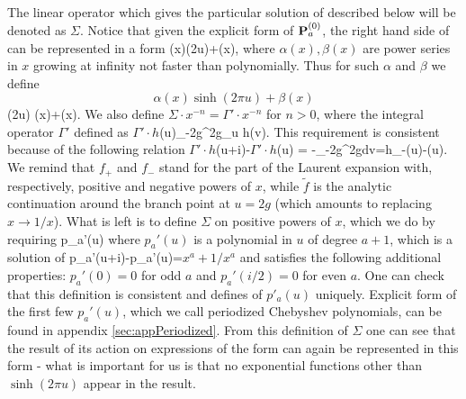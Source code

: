 The linear operator which gives the particular solution of  described below will be denoted as $\Sigma$.
Notice that given the explicit form  of ${\bf P}^{(0)}_a$, the right hand side of  can be represented in a form
\beq
\alpha(x)\sinh(2\pi u)+\beta(x),
\label{alphabetasinh}
\eeq
where $\alpha(x),\beta(x)$ are power series in $x$ growing at infinity not faster than polynomially. 
Thus for such $\alpha$ and $\beta$ we define
\beq
\Sigma\cdot\[\alpha(x)\sinh(2\pi u)+\beta(x)\]\equiv \sinh(2\pi u) \Sigma\cdot \alpha(x)+\Sigma\cdot \beta(x).
\eeq
We also define $\Sigma\cdot x^{-n}=\Gamma'\cdot x^{-n}$ for $n>0$, where the integral operator $\Gamma'$ defined as
\beq
\(\Gamma'\cdot h\)(u)\equiv \oint_{-2g}^{2g}\partial_u \log \frac{\Gamma[i (u-v)+1]}{\Gamma[-i (u-v)]}h(v).
\label{Gammaprime}
\eeq
This requirement is consistent because of the following relation
\beq
\(\Gamma'\cdot h\)(u+i)-\(\Gamma'\cdot h\)(u)
=
-\oint_{-2g}^{2g}dv=h_-(u)-(u).
\label{eq:Gammaproperty}
\eeq
We remind that $f_+$ and $f_-$ stand for the part of the Laurent expansion with, respectively, positive and negative powers of $x$, while $\tilde f$ is the analytic continuation around the branch point at $u=2g$ (which amounts to replacing $x\to 1/x$).
What is left is to define $\Sigma$ on positive powers of $x$, which we do by requiring
\beq
\Sigma\cdot\left[x^a+1/x^a\right]\equiv p_a'(u) %
\label{paprime}
\eeq
where $p_a'(u)$ is a polynomial in $u$ of degree $a+1$, which is a solution of
\beq
p_a'(u+i)-p_a'(u)=\(x^a+1/x^a\)
\eeq
and satisfies the following additional properties: $p_a'(0)=0$ for odd $a$  and $p_a'(i/2)=0$ for even $a$. 
One can check that this definition is consistent and defines of $p'_a(u)$ uniquely. 
Explicit form of the first few $p_a'(u)$, which we call periodized  Chebyshev polynomials, can be found in appendix \ref{sec:appPeriodized}.
From this definition of $\Sigma$ one can see that the result of its action on expressions of the form  can again be represented in this form - what is important for us is that no exponential functions other than $\sinh(2\pi u)$ appear in the result.

